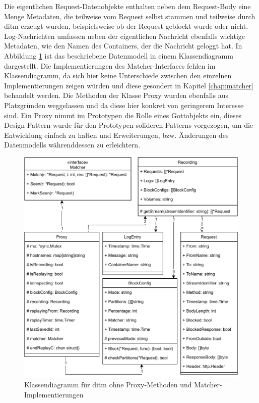 \documentclass[12pt,a4paper]{report}
\begin{document}
Die eigentlichen Request-Datenobjekte enthalten neben dem Request-Body eine Menge Metadaten, die teilweise vom Request selbst
stammen und teilweise durch ditm erzeugt wurden, beispielsweise ob der Request geblockt wurde oder nicht.
Log-Nachrichten umfassen neben der eigentlichen Nachricht ebenfalls wichtige Metadaten, wie den Namen des Containers, der die
Nachricht geloggt hat. In Abbildung \ref{fig:class} ist das beschriebene Datenmodell in einem Klassendiagramm dargestellt. Die
Implementierungen des Matcher-Interfaces fehlen im Klassendiagramm, da sich hier keine Unterschiede zwischen den einzelnen
Implementierungen zeigen würden und diese gesondert in Kapitel \ref{chap:matcher} behandelt werden. Die Methoden der Klasse Proxy wurden
ebenfalls aus Platzgründen weggelassen und da diese hier konkret von geringerem Interesse sind. Ein Proxy nimmt im Prototypen die
Rolle eines Gottobjekts ein, dieses Design-Pattern wurde für den Prototypen solideren Patterns vorgezogen, um die Entwicklung
einfach zu halten und Erweiterungen, bzw. Änderungen des Datenmodells währenddessen zu erleichtern.
\begin{figure}[H]
	\centering
	\includegraphics[width=\linewidth]{img/ditm-Class.pdf}
	\caption{Klassendiagramm für ditm ohne Proxy-Methoden und Matcher-Implementierungen}
	\label{fig:class}
\end{figure}
\end{document}
